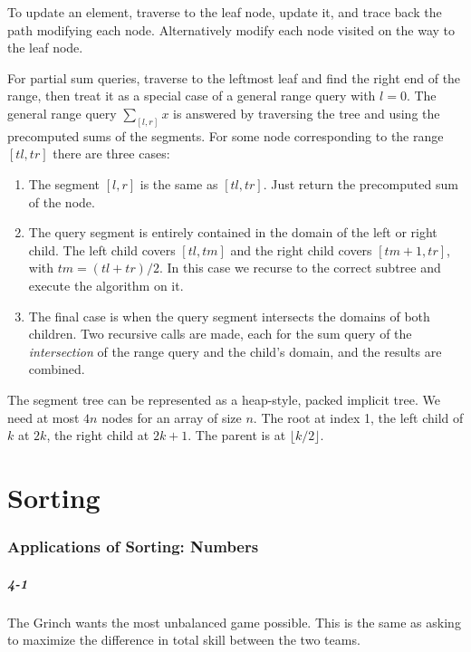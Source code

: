 \documentclass{report}
\begin{document}

To update an element, traverse to the leaf node, update it, and trace back the path modifying each node. Alternatively modify each node visited on the way to the leaf node.

For partial sum queries, traverse to the leftmost leaf and find the right end of the range, then treat it as a special case of a general range query with $l=0$. The general range query $\sum_{[l,r]} x$ is answered by traversing the tree and using the precomputed sums of the segments. For some node corresponding to the range $[tl,tr]$ there are three cases:

\begin{enumerate}
	\item The segment $[l,r]$ is the same as $[tl,tr]$. Just return the precomputed sum of the node.
	\item The query segment is entirely contained in the domain of the left or right child. The left child covers $[tl,tm]$ and the right child covers $[tm+1, tr]$, with $tm=(tl+tr)/2$. In this case we recurse to the correct subtree and execute the algorithm on it.
	\item The final case is when the query segment intersects the domains of both children. Two recursive calls are made, each for the sum query of the \emph{intersection} of the range query and the child's domain, and the results are combined.
\end{enumerate}

The segment tree can be represented as a heap-style, packed implicit tree. We need at most $4n$ nodes for an array of size $n$. The root at index 1, the left child of $k$ at $2k$, the right child at $2k+1$. The parent is at $\lfloor k/2\rfloor$.

\chapter{Sorting}


\subsection*{Applications of Sorting: Numbers}

\paragraph{4-1} The Grinch wants the most unbalanced game possible. This is the same as asking to maximize the difference in total skill between the two teams.
\end{document}
